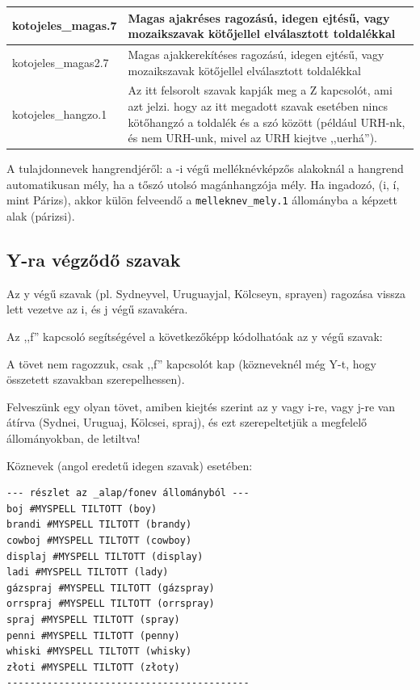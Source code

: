 \begin{longtable}[l]{lp{10cm}}
\\ \hline kotojeles\_magas.7 & Magas ajakréses ragozású, idegen ejtésű, vagy mozaikszavak kötőjellel elválasztott toldalékkal
\\ \hline kotojeles\_magas2.7 & Magas ajakkerekítéses ragozású, idegen ejtésű, vagy mozaikszavak kötőjellel elválasztott toldalékkal
\\ \hline kotojeles\_hangzo.1 & Az itt felsorolt szavak kapják meg a Z kapcsolót, ami azt jelzi. hogy az itt megadott szavak esetében
nincs kötőhangzó a toldalék és a szó között (például URH-nk, és nem URH-unk, mivel az URH kiejtve ,,uerhá'').
\\ \hline \end{longtable}

A tulajdonnevek hangrendjéről: a -i végű melléknévképzős alakoknál a hangrend automatikusan
mély, ha a tőszó utolsó magánhangzója mély. Ha ingadozó, (i, í, mint Párizs), akkor
külön felveendő a \texttt{melleknev\_mely.1} állományba a képzett alak (párizsi).

\subsection{Y-ra végződő szavak}

	Az y végű szavak (pl. Sydneyvel, Uruguayjal, Kölcseyn, sprayen)
	ragozása vissza lett vezetve az i, és j végű szavakéra. 
	
	Az ,,f'' kapcsoló segítségével a következőképp kódolhatóak az
	y végű szavak:

	A tövet nem ragozzuk, csak ,,f'' kapcsolót kap (közneveknél
	még Y-t, hogy összetett szavakban szerepelhessen).
	
	Felveszünk egy olyan tövet, amiben kiejtés szerint
	az y vagy i-re, vagy j-re van átírva (Sydnei, Uruguaj, Kölcsei,
	spraj), és ezt szerepeltetjük a megfelelő állományokban, de letiltva!

Köznevek (angol eredetű idegen szavak) esetében:

\begin{verbatim}
--- részlet az _alap/fonev állományból ---
boj #MYSPELL TILTOTT (boy)
brandi #MYSPELL TILTOTT (brandy)
cowboj #MYSPELL TILTOTT (cowboy)
displaj #MYSPELL TILTOTT (display)
ladi #MYSPELL TILTOTT (lady)
gázspraj #MYSPELL TILTOTT (gázspray)
orrspraj #MYSPELL TILTOTT (orrspray)
spraj #MYSPELL TILTOTT (spray)
penni #MYSPELL TILTOTT (penny)
whiski #MYSPELL TILTOTT (whisky)
złoti #MYSPELL TILTOTT (złoty)
------------------------------------------
\end{verbatim}

